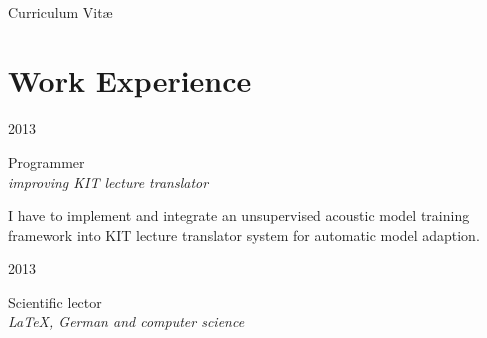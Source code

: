 \documentclass[a4paper,10pt]{article} %
\begin{document}
\color{text1} %


\par{\\ %
{\Huge \color{headings} Curriculum {Vit\ae}\\[15pt]\par}
	

\begin{minipage}[t]{0.5\textwidth}
\vspace{0pt} %
	

\section{Work Experience} 


{\raggedleft\textsc{2013}\par}

{\raggedright\large Programmer\\
\textit{improving KIT lecture translator}\\[5pt]}

\normalsize{I have to implement and integrate an unsupervised acoustic model training framework into KIT lecture translator system for automatic model adaption.}\\


{\raggedleft\textsc{2013}\par}

{\raggedright\large Scientific lector\\
\textit{\LaTeX{}, German and computer science}\\[5pt]}


\end{minipage}}
\end{document}
